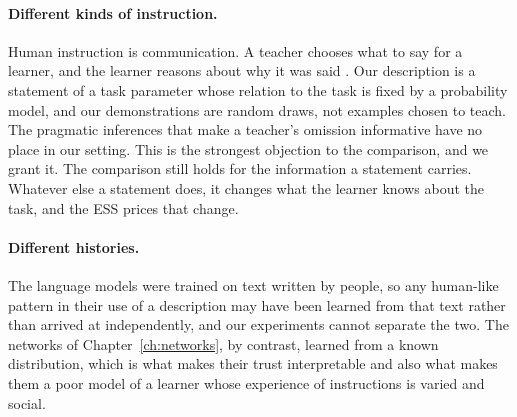 \paragraph{Different kinds of instruction.} Human instruction is communication. A teacher chooses what to say for a learner, and the learner reasons about why it was said \citep{shafto2014, sperber2010}. Our description is a statement of a task parameter whose relation to the task is fixed by a probability model, and our demonstrations are random draws, not examples chosen to teach. The pragmatic inferences that make a teacher's omission informative \citep{bonawitz2011, gweon2014} have no place in our setting. This is the strongest objection to the comparison, and we grant it. The comparison still holds for the information a statement carries. Whatever else a statement does, it changes what the learner knows about the task, and the ESS prices that change.

\paragraph{Different histories.} The language models were trained on text written by people, so any human-like pattern in their use of a description may have been learned from that text rather than arrived at independently, and our experiments cannot separate the two. The networks of Chapter~\ref{ch:networks}, by contrast, learned from a known distribution, which is what makes their trust interpretable and also what makes them a poor model of a learner whose experience of instructions is varied and social.


